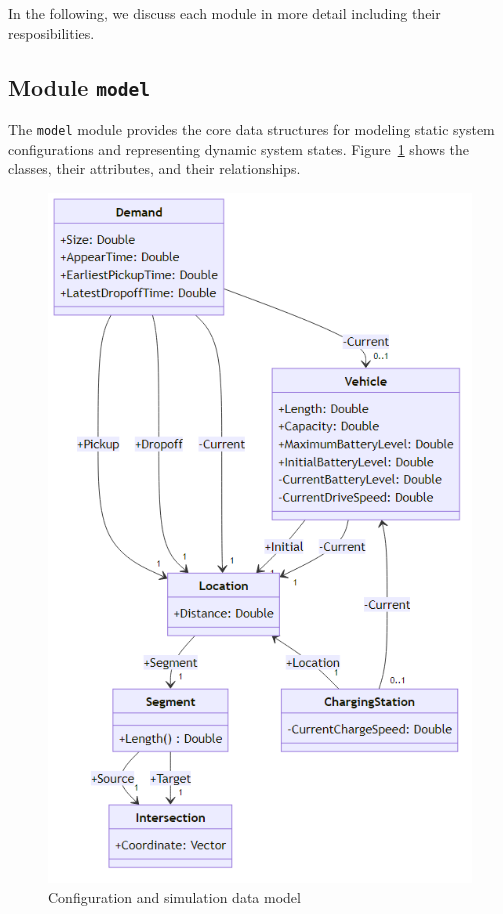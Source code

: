 \documentclass[10pt,twocolumn]{article}
\begin{document}
In the following, we discuss each module in more detail including their resposibilities.

\subsection{Module \texttt{model}}
\label{sec:data-model}

The \texttt{model} module provides the core data structures for modeling static system configurations and representing dynamic system states.
Figure~\ref{fig:data-model} shows the classes, their attributes, and their relationships.

\begin{figure}[h!]
    \centering
    \includegraphics[scale=0.4]{../../diagrams/model/classes-v0.2.png}
    \caption{Configuration and simulation data model}
    \label{fig:data-model}
\end{figure}
\end{document}
